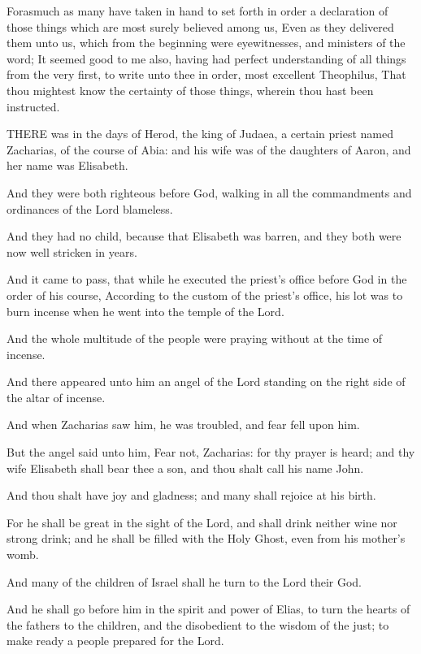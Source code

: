 \Chapter
\Verse Forasmuch as many have taken in hand to set forth in order a declaration of those things which are most surely believed among us, \Verse Even as they delivered them unto us, which from the beginning were eyewitnesses, and ministers of the word; \Verse It seemed good to me also, having had perfect understanding of all things from the very first, to write unto thee in order, most excellent Theophilus, \Verse That thou mightest know the certainty of those things, wherein thou hast been instructed.

\Verse THERE was in the days of Herod, the king of Judaea, a certain priest named Zacharias, of the course of Abia: and his wife was of the daughters of Aaron, and her name was Elisabeth.

\Verse And they were both righteous before God, walking in all the commandments and ordinances of the Lord blameless.

\Verse And they had no child, because that Elisabeth was barren, and they both were now well stricken in years.

\Verse And it came to pass, that while he executed the priest's office before God in the order of his course, \Verse According to the custom of the priest's office, his lot was to burn incense when he went into the temple of the Lord.

\Verse And the whole multitude of the people were praying without at the time of incense.

\Verse And there appeared unto him an angel of the Lord standing on the right side of the altar of incense.

\Verse And when Zacharias saw him, he was troubled, and fear fell upon him.

\Verse But the angel said unto him, Fear not, Zacharias: for thy prayer is heard; and thy wife Elisabeth shall bear thee a son, and thou shalt call his name John.

\Verse And thou shalt have joy and gladness; and many shall rejoice at his birth.

\Verse For he shall be great in the sight of the Lord, and shall drink neither wine nor strong drink; and he shall be filled with the Holy Ghost, even from his mother's womb.

\Verse And many of the children of Israel shall he turn to the Lord their God.

\Verse And he shall go before him in the spirit and power of Elias, to turn the hearts of the fathers to the children, and the disobedient to the wisdom of the just; to make ready a people prepared for the Lord.

